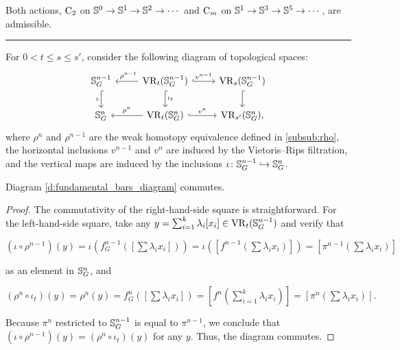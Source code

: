 
\lemma Both actions, \(\mathrm{C}_2\) on \(\mathbb{S}^0 \to \mathbb{S}^1 \to \mathbb{S}^2 \to \dotsb\) and \(\mathrm{C}_m\) on \(\mathbb{S}^1 \to \mathbb{S}^3 \to \mathbb{S}^5 \to \dotsb\), are admissible.

\noindent\rule{\textwidth}{0.4pt}

For $0 < t\leq s \leq s'$, consider the following diagram of topological spaces:
\begin{equation}\label{d:fundamental_bars_diagram}
	\begin{tikzcd}
		\bS^{n-1}_G
		\ar[d, hook,"{\iota}" left]
		&
		\VR_t(\bS^{n-1}_G)
		\ar[d, hook,"\iota_t"]
		\ar[l, "\ \rho^{n-1}" above]
		\ar[r, hook, "v^{n-1}"]
		&
		\VR_{s}(\bS^{n-1}_G)
		\ar[d, hook]
		\\
		\bS^{n}_G
		&
		\VR_t(\bS^{n}_G)
		\ar[l, "\rho^n" above]
		\ar[r, hook, "v^{n}"]
		&
		\VR_{s'}(\bS^{n}_G),
	\end{tikzcd}
\end{equation}
where $\rho^n$ and $\rho^{n-1}$ are the weak homotopy equivalence defined in \cref{subsub:rho}, the horizontal inclusions $v^{n-1}$ and $v^n$ are induced by the Vietoris--Rips filtration, and the vertical maps are induced by the inclusions $\iota \colon \mathbb{S}^{n-1}_G \hookrightarrow \mathbb{S}^{n}_G$.

\medskip\lemma
Diagram \eqref{d:fundamental_bars_diagram} commutes.

\begin{proof}
	The commutativity of the right-hand-side square is straightforward.
	For the left-hand-side square, take any $y = \sum_{i=1}^k \lambda_i [x_i] \in \operatorname{VR}_t(\mathbb{S}^{n-1}_G)$ and verify that
	\begin{center}
		$(\iota \circ \rho^{n-1})(y)
		=\iota(f^{n-1}_G([\sum \lambda_i x_i]))
		=\iota([f^{n-1}(\sum \lambda_i x_i)])
		=[\pi^{n-1}(\sum \lambda_i x_i)]
		$
	\end{center}
	as an element in $\mathbb{S}^n_G$, and
	\begin{center}
		$(\rho^{n} \circ \iota_t)(y) = \rho^{n}(y) = f^{n}_G([\sum \lambda_i x_i]) = [f^{n}(\sum_{i=1}^k \lambda_i x_i)] = [\pi^{n}(\sum \lambda_i x_i)].
		$
	\end{center}
	Because $\pi^{n}$ restricted to $\mathbb{S}^{n-1}_G$ is equal to $\pi^{n-1}$, we conclude that $(\iota \circ \rho^{n-1})(y) = (\rho^n \circ \iota_t)(y)$ for any $y$.
	Thus, the diagram commutes.
\end{proof}

